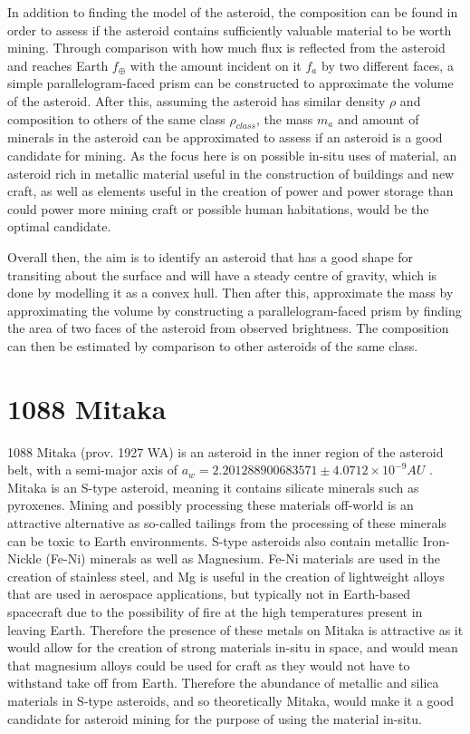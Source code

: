 \documentclass[10pt,twocolumn]{revtex4}    %
\newcommand*{\earth}{{\oplus}}
\begin{document}
In addition to finding the model of the asteroid, the composition can be found in order to assess if the asteroid contains sufficiently valuable material to be worth mining. Through comparison with how much flux is reflected from the asteroid and reaches Earth $f_\earth$ with the amount incident on it $f_a$ by two different faces, a simple parallelogram-faced prism can be constructed to approximate the volume of the asteroid. After this, assuming the asteroid has similar density $\rho$ and composition to others of the same class $\rho_{class}$, the mass $m_a$ and amount of minerals in the asteroid can be approximated to assess if an asteroid is a good candidate for mining.
As the focus here is on possible in-situ uses of material, an asteroid rich in metallic material useful in the construction of buildings and new craft, as well as elements useful in the creation of power and power storage than could power more mining craft or possible human habitations, would be the optimal candidate. 

Overall then, the aim is to identify an asteroid that has a good shape for transiting about the surface and will have a steady centre of gravity, which is done by modelling it as a convex hull. Then after this, approximate the mass by approximating the volume by constructing a parallelogram-faced prism by finding the area of two faces of the asteroid from observed brightness. The composition can then be estimated by comparison to other asteroids of the same class.  

\section{1088 Mitaka}
1088 Mitaka (prov. 1927 WA) is an asteroid in the inner region of the asteroid belt, with a semi-major axis of $a_w = 2.201288900683571\pm4.0712\times10^{-9}AU$ \cite{jplMitaka}. Mitaka is an S-type asteroid, meaning it contains silicate minerals such as pyroxenes. Mining and possibly processing these materials off-world is an attractive alternative as so-called tailings from the processing of these minerals can be toxic to Earth environments. S-type asteroids also contain metallic Iron-Nickle (Fe-Ni) minerals as well as Magnesium. Fe-Ni materials are used in the creation of stainless steel, and Mg is useful in the creation of lightweight alloys that are used in aerospace applications, but typically not in Earth-based spacecraft due to the possibility of fire at the high temperatures present in leaving Earth. Therefore the presence of these metals on Mitaka is attractive as it would allow for the creation of strong materials in-situ in space, and would mean that magnesium alloys could be used for craft as they would not have to withstand take off from Earth. Therefore the abundance of metallic and silica materials in S-type asteroids, and so theoretically Mitaka, would make it a good candidate for asteroid mining for the purpose of using the material in-situ. 
\end{document}
